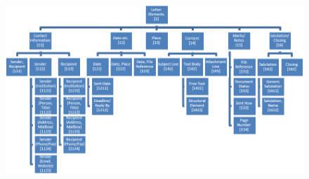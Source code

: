 \documentclass[11pt,a4paper]{article}
\begin{document}
\newpage 
\begin{figure}
\includegraphics[scale=0.4]{hKat.png}
\end{figure}
\end{document}
